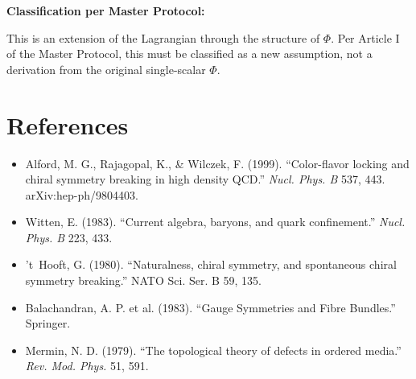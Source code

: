 \documentclass[12pt]{article}
\begin{document}
\textbf{Classification per Master Protocol:}


This is an extension of the Lagrangian through the structure of $\Phi$. Per Article I of the Master Protocol, this must be classified as a new assumption, not a derivation from the original single-scalar $\Phi$.

\section*{References}
\begin{itemize}
    \item Alford, M. G., Rajagopal, K., \& Wilczek, F. (1999). ``Color-flavor locking and chiral symmetry breaking in high density QCD.'' \textit{Nucl. Phys. B} 537, 443. arXiv:hep-ph/9804403.
    \item Witten, E. (1983). ``Current algebra, baryons, and quark confinement.'' \textit{Nucl. Phys. B} 223, 433.
    \item 't~Hooft, G. (1980). ``Naturalness, chiral symmetry, and spontaneous chiral symmetry breaking.'' NATO Sci. Ser. B 59, 135.
    \item Balachandran, A. P. et al. (1983). ``Gauge Symmetries and Fibre Bundles.'' Springer.
    \item Mermin, N. D. (1979). ``The topological theory of defects in ordered media.'' \textit{Rev. Mod. Phys.} 51, 591.
\end{itemize}
\end{document}
